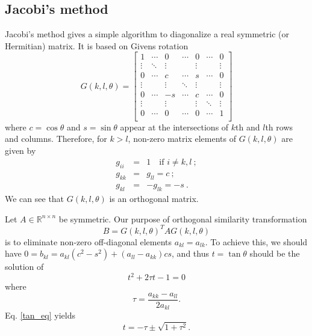 \documentclass{article}
\begin{document}
	\subsection{Jacobi's method}\label{jacobi}
Jacobi's method gives a simple algorithm to diagonalize a real symmetric (or Hermitian) matrix. 
It is based on Givens rotation 
\begin{equation}\label{Givens}
G(k,l,\theta)=
\begin{bmatrix}
1  &  \cdots  & 0 & \cdots & 0 & \cdots & 0 \\
\vdots  & \ddots  & \vdots & & \vdots &  & \vdots \\
0  & \cdots & c  & \cdots & s & \cdots & 0  \\
\vdots &  & \vdots & \ddots & \vdots &  &\vdots \\
0 & \cdots & -s & \cdots & c & \cdots & 0 \\
\vdots &  & \vdots & & \vdots & \ddots & \vdots \\
0 & \cdots & 0 & \cdots & 0 & \cdots & 1 \\ 
\end{bmatrix}
\end{equation}
where $c=\cos\theta$ and $s=\sin\theta$ appear at the intersections of $k$th and $l$th rows and columns. 
Therefore, for $k>l$, non-zero matrix elements of $G(k,l,\theta)$ are given by 
\begin{eqnarray*}
g_{ii}&=&1 \quad \text{if } i\neq k,l\ ; \\
g_{kk}&=&g_{ll}=c\ ; \\
g_{kl}&=&-g_{lk}=-s\ . 
\end{eqnarray*}
We can see that $G(k,l,\theta)$ is an orthogonal matrix. 
\par
Let $A\in \mathbb{R}^{n \times n}$ be symmetric. Our purpose of orthogonal similarity transformation 
\begin{equation}\label{GivensSimilarity}
B=G(k,l,\theta)^{T}AG(k,l,\theta)
\end{equation}
is to eliminate non-zero off-diagonal elements $a_{kl}=a_{lk}$. 
To achieve this, we should have $0=b_{kl}=a_{kl}(c^2-s^2)+(a_{ll}-a_{kk})cs$, 
and thus $t=\tan\theta$ should be the solution of 
\begin{equation}\label{tan_eq}
t^2+2\tau t -1 = 0
\end{equation}
where
\begin{equation}
\tau=\frac{a_{kk}-a_{ll}}{2a_{kl}}. 
\end{equation}
Eq. \ref{tan_eq} yields 
\begin{equation}\label{root}
t=-\tau\pm\sqrt{1+\tau^2}.
\end{equation}
\end{document}
